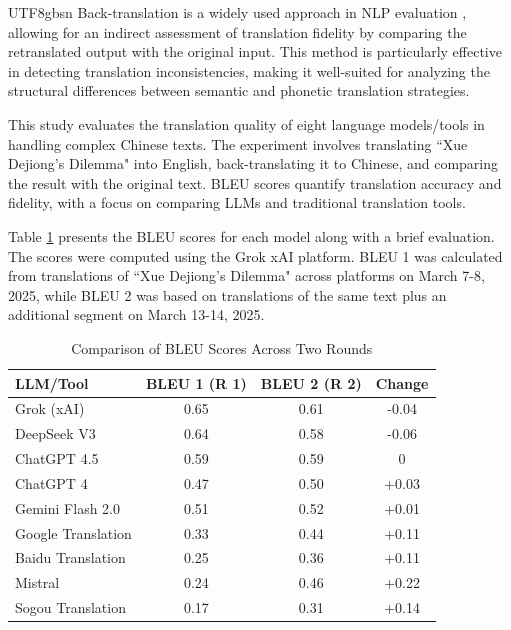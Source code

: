 \documentclass[conference]{IEEEtran}
\begin{document}
\begin{CJK*}{UTF8}{gbsn}
Back-translation is a widely used approach in NLP evaluation \citep{hoang2018iterative}, allowing for an indirect assessment of translation fidelity by comparing the retranslated output with the original input. This method is particularly effective in detecting translation inconsistencies, making it well-suited for analyzing the structural differences between semantic and phonetic translation strategies.

This study evaluates the translation quality of eight language models/tools in handling complex Chinese texts. The experiment involves translating “Xue Dejiong’s Dilemma" into English, back-translating it to Chinese, and comparing the result with the original text. BLEU scores quantify translation accuracy and fidelity, with a focus on comparing LLMs and traditional translation tools.

Table \ref{tab:bleu_comparison} presents the BLEU scores for each model along with a brief evaluation. The scores were computed using the Grok xAI platform. BLEU 1 was calculated from translations of “Xue Dejiong’s Dilemma" across platforms on March 7-8, 2025, while BLEU 2 was based on translations of the same text plus an additional segment on March 13-14, 2025.

\begin{table}[h]
\centering
\caption{Comparison of BLEU Scores Across Two Rounds} %
\label{tab:bleu_comparison}
\begin{tabular}{lccc}
\toprule
\textbf{LLM/Tool}         & \textbf{BLEU 1 (R 1)} & \textbf{BLEU 2 (R 2)} & \textbf{Change} \\
\midrule
Grok (xAI)               & 0.65                     & 0.61                     & -0.04          \\
DeepSeek V3              & 0.64                     & 0.58                     & -0.06          \\
ChatGPT 4.5              & 0.59                     & 0.59                        & 0              \\
ChatGPT 4                & 0.47                     & 0.50                     & +0.03          \\
Gemini Flash 2.0         & 0.51                        & 0.52                     & +0.01              \\
Google Translation       & 0.33                     & 0.44                     & +0.11          \\
Baidu Translation        & 0.25                     & 0.36                     & +0.11          \\
Mistral                  & 0.24                     & 0.46                     & +0.22          \\
Sogou Translation        & 0.17                     & 0.31                     & +0.14          \\
\bottomrule
\end{tabular}
\end{table}


\end{CJK*}
\end{document}
